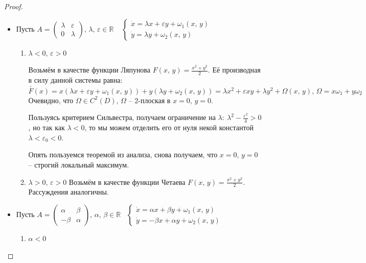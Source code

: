 \documentclass[a4paper,12pt]{article}
\theoremstyle{plain}
\theoremstyle{definition}
\theoremstyle{remark}
\begin{document}
\begin{proof}
\begin{itemize}
		\item Пусть $A = \begin{pmatrix}
				      \lambda & \varepsilon \\
				      0       & \lambda
			      \end{pmatrix},\, \lambda,\, \varepsilon \in \mathbb{R}\;\;\;\; \begin{cases}
				      \dot{x} = \lambda x + \varepsilon y + \omega_1(x,\,y) \\
				      \dot{y} = \lambda y + \omega_2(x,\,y)
			      \end{cases}$

		      \begin{enumerate}
			      \item $\lambda < 0,\, \varepsilon > 0$

			            Возьмём в качестве функции Ляпунова $F(x,\,y) = \frac{x^2 + y^2}{2}$. Её производная в силу данной системы равна: \[\overset{'}{F}(x) = x(\lambda x + \varepsilon y + \omega_1(x,\,y)) + y(\lambda y + \omega_2(x,\,y)) = \lambda x^2 + \varepsilon xy + \lambda y^2 + \Omega(x,\,y),\, \Omega = x\omega_1 + y\omega_2\]
			            Очевидно, что $\Omega \in C^2(D),\, \Omega$ -- 2-плоская в $x = 0,\, y = 0$.

			            Пользуясь критерием Сильвестра, получаем ограничение на $\lambda:\: \lambda^2 - \frac{\varepsilon^2}{4} > 0$, но так как $\lambda < 0$, то мы можем отделить его от нуля некой константой $\lambda < \varepsilon_0 < 0$.

			            Опять пользуемся теоремой из анализа, снова получаем, что $x = 0,\, y = 0$ -- строгий локальный максимум.
			      \item $\lambda > 0,\, \varepsilon > 0$
			            Возьмём в качестве функции Четаева $F(x,\,y) = \frac{x^2 + y^2}{2}$. Рассуждения аналогичны.
		      \end{enumerate}
		\item Пусть $A = \begin{pmatrix}
				      \alpha & \beta  \\
				      -\beta & \alpha
			      \end{pmatrix},\, \alpha,\, \beta \in \mathbb{R}\;\;\; \begin{cases}
				      \dot{x} = \alpha x + \beta y + \omega_1(x,\,y) \\
				      \dot{y} = -\beta x + \alpha y + \omega_2(x,\,y)
			      \end{cases}$

		      \begin{enumerate}
			      \item $\alpha < 0$


\end{enumerate}
\end{itemize}
\end{proof}
\end{document}
